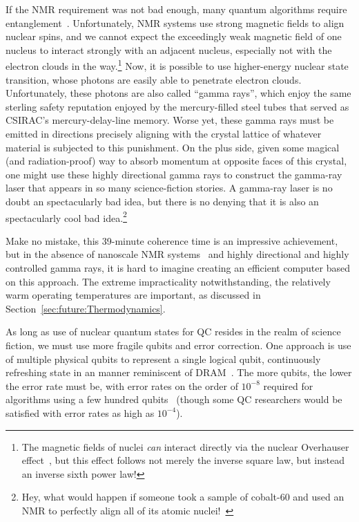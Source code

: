 If the NMR requirement was not bad enough, many quantum algorithms require
entanglement~\cite{PeterWSchor2001QuantumAlgorithms}.
Unfortunately, NMR systems use strong magnetic fields to align
nuclear spins, and we cannot expect the exceedingly weak magnetic
field of one nucleus to interact strongly with an adjacent nucleus,
especially not with the electron clouds in the way.\footnote{
	The magnetic fields of nuclei \emph{can} interact directly
	via the nuclear Overhauser effect~\cite{PhysRev.92.411},
	but this effect follows not merely the inverse square law,
	but instead an inverse sixth power law!}
Now, it is possible to use higher-energy nuclear state transition,
whose photons are easily able to penetrate electron clouds.
Unfortunately, these photons are also called ``gamma rays'', which enjoy
the same sterling safety reputation enjoyed by the mercury-filled steel
tubes that served as CSIRAC's mercury-delay-line memory.
Worse yet, these gamma rays must be emitted in directions precisely
aligning with the crystal lattice of whatever material is subjected
to this punishment.
On the plus side, given some magical (and radiation-proof) way to absorb
momentum at opposite faces of this crystal, one might use these highly
directional gamma rays to construct the gamma-ray laser that appears in
so many science-fiction stories.
A gamma-ray laser is no doubt an spectacularly bad idea, but there is no
denying that it is also an spectacularly cool bad idea.\footnote{
	Hey, what would happen if someone took a sample of
	cobalt-60 and used an NMR to perfectly align all of its
	atomic nuclei!~\cite{1957PhRv..105.1413W}}

Make no mistake, this 39-minute coherence time is an impressive
achievement, but in the absence
of nanoscale NMR systems~\cite{HJMamin2013QC-nanoscale-NMR} and
highly directional and highly controlled gamma rays, it is
hard to imagine creating an efficient computer based on this approach.
The extreme impracticality notwithstanding, the relatively warm operating
temperatures are important, as discussed in
Section~\ref{sec:future:Thermodynamics}.

As long as use of nuclear quantum states for QC resides in the
realm of science fiction, we must use more fragile qubits
and error correction.
One approach is use of multiple physical qubits to represent
a single logical qubit, continuously refreshing state in an
manner reminiscent of DRAM~\cite{DanielThomasSankPhD}.
The more qubits, the lower the error rate must be, with error
rates on the order of $10^{-8}$ required for algorithms using
a few hundred qubits~\cite{DanielThomasSankPhD} (though some
QC researchers would be satisfied with error rates as high as
$10^{-4}$).

